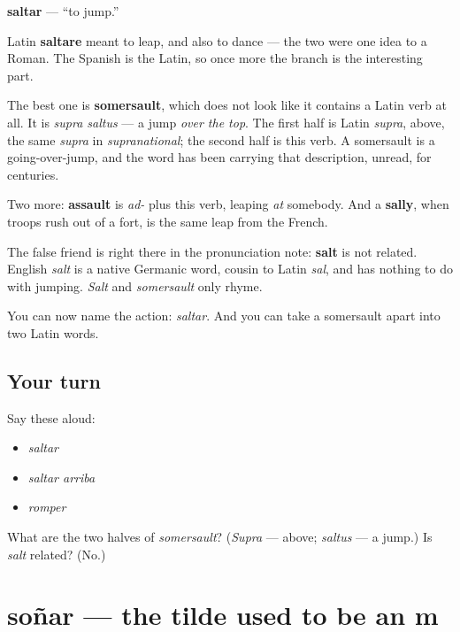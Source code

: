 \begin{cousinweb}
\textbf{saltar} — \textquotedblleft{}to jump.\textquotedblright{}

Latin \textbf{saltare} meant to leap, and also to dance — the two were one idea to a Roman. The Spanish is the Latin, so once more the branch is the interesting part.

The best one is \textbf{somersault}, which does not look like it contains a Latin verb at all. It is \emph{supra saltus} — a jump \emph{over the top}. The first half is Latin \emph{supra}, above, the same \emph{supra} in \emph{supranational}; the second half is this verb. A somersault is a going-over-jump, and the word has been carrying that description, unread, for centuries.

Two more: \textbf{assault} is \emph{ad-} plus this verb, leaping \emph{at} somebody. And a \textbf{sally}, when troops rush out of a fort, is the same leap from the French.

The false friend is right there in the pronunciation note: \textbf{salt} is not related. English \emph{salt} is a native Germanic word, cousin to Latin \emph{sal}, and has nothing to do with jumping. \emph{Salt} and \emph{somersault} only rhyme.
\end{cousinweb}

\begin{grammarlens}[title={What you've built}]
You can now name the action: \emph{saltar}. And you can take a somersault apart into two Latin words.
\end{grammarlens}

\subsection*{Your turn}
Say these aloud:

\begin{itemize}
\raggedright
  \item \emph{saltar}
  \item \emph{saltar arriba}
  \item \emph{romper}
\end{itemize}

\begin{tcolorbox}[breakable,colback=teal!4,colframe=teal!35!black,title={Before you move on}]
What are the two halves of \emph{somersault}? (\emph{Supra} — above; \emph{saltus} — a jump.) Is \emph{salt} related? (No.)
\end{tcolorbox}
\section[soñar]{soñar — the tilde used to be an m}

